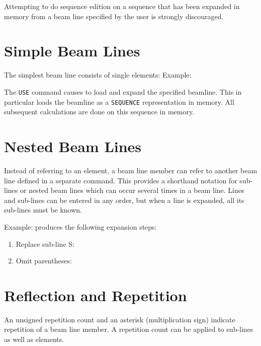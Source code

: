 Attempting to do sequence edition on a sequence that has been expanded
in memory from a beam line specified by the user is strongly discouraged. 

\section{Simple Beam Lines} 
\label{sec:beamline}
The simplest beam line consists of single elements: 
Example: 

The \texttt{USE} command causes \madx to load and expand the specified
beamline. This in particular loads the beamline as a \texttt{SEQUENCE}
representation in memory. All subsequent calculations are done on this
sequence in memory.  

\section{Nested Beam Lines}
\label{sec:sublines}

Instead of referring to an element, a beam line member can refer to
another beam line defined in a separate command. This provides a
shorthand notation for sub-lines or nested beam lines which can occur
several times in a beam line. 
Lines and sub-lines can be entered in any order, but when a line is
expanded, all its sub-lines must be known.   

Example: 
produces the following expansion steps: 
\begin{enumerate}
  \item Replace sub-line S: 
  \item Omit parentheses: 
\end{enumerate}

\section{Reflection and Repetition} 
\label{sec:reflect-repeat-lines}
An unsigned repetition count and an asterisk (multiplication sign)
indicate repetition of a beam line member. 
A repetition count can be applied to sub-lines as well as elements. 


